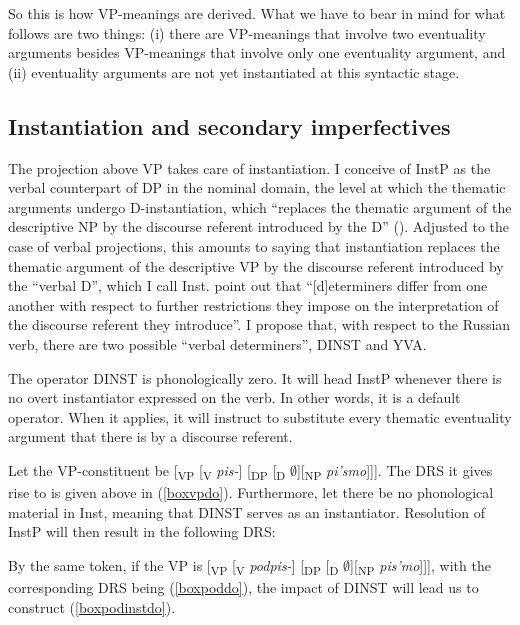 \documentclass[output=paper,colorlinks,citecolor=brown]{langscibook}
\begin{document}
\noindent So this is how VP-meanings are derived. What we have to bear in mind for what follows are two things: (i) there are 
VP-meanings that involve two eventuality arguments besides 
VP-meanings that involve only one eventuality argument, and (ii) 
eventuality arguments are not yet instantiated at this syntactic stage. 

\subsection{Instantiation and secondary imperfectives} \label{S2c}
The projection above VP takes care of instantiation. I conceive of InstP as the verbal counterpart of DP in the nominal domain, the level at which the thematic arguments undergo D-instantiation, which ``replaces the thematic argument of the descriptive NP by the discourse referent introduced by the D'' (\citealt[35]{FarkasdeSwart2003}).
Adjusted to the case of verbal projections, this amounts to saying that instantiation replaces the thematic argument of the descriptive VP by the discourse referent introduced by the 
``verbal D'', which I call Inst. \citet[34]{FarkasdeSwart2003} point out that ``[d]eterminers differ from one another with respect to further restrictions they impose on the interpretation of the discourse referent they introduce''.    
I propose that, with respect to the Russian verb, there are two possible ``verbal determiners'', DINST and YVA. 

The operator DINST is phonologically zero. It will head InstP whenever there is no overt instantiator expressed on the verb. In other words, it is a default operator. When it applies, it will instruct to substitute every thematic eventuality argument that there is by a discourse referent. 

Let the VP-constituent be [\textsubscript{VP} [\textsubscript{V} \textit{pis-}] [\textsubscript{DP} [\textsubscript{D} $\emptyset$][\textsubscript{NP} \textit{pi'smo}]]]. The DRS it gives rise to is given above in (\ref{boxvpdo}). Furthermore, let there be no phonological material
in Inst, meaning that DINST serves as an instantiator. Resolution of InstP will then result in the following DRS:


\noindent By the same token, if the VP 
is [\textsubscript{VP} [\textsubscript{V} \textit{podpis-}] [\textsubscript{DP} [\textsubscript{D} $\emptyset$][\textsubscript{NP} \textit{pis'mo}]]], with the corresponding DRS being (\ref{boxpoddo}), the impact of DINST will lead us to construct (\ref{boxpodinstdo}).
\end{document}
